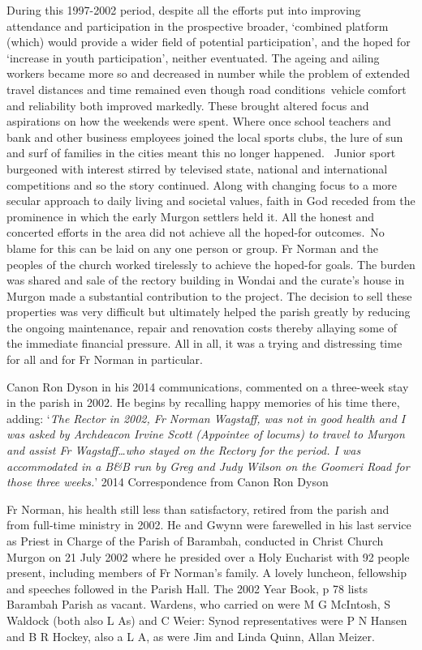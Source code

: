 During this 1997-2002 period, despite all the efforts put into improving attendance and participation in the prospective broader, `combined platform (which) would provide a wider field of potential participation', and the hoped for `increase in youth participation', neither eventuated. The ageing and ailing workers became more so and decreased in number while the problem of extended travel distances and time remained even though road conditions~vehicle comfort and reliability both improved markedly. These brought altered focus and aspirations on how the weekends were spent. Where once school teachers and bank and other business employees joined the local sports clubs, the lure of sun and surf of families in the cities meant this no longer happened.~ Junior sport burgeoned with interest stirred by televised state, national and international competitions and so the story continued. Along with changing focus to a more secular approach to daily living and societal values, faith in God receded from the prominence in which the early Murgon settlers held it. All the honest and concerted efforts in the area did not achieve all the hoped-for outcomes.~No blame for this can be laid on any one person or group. Fr Norman and the peoples of the church worked tirelessly to achieve the hoped-for goals. The burden was shared and sale of the rectory building in Wondai and the curate's house in Murgon made a substantial contribution to the project. The decision to sell these properties was very difficult but ultimately helped the parish greatly by reducing the ongoing maintenance, repair and renovation costs thereby allaying some of the immediate financial pressure. All in all, it was a trying and distressing time for all and for Fr Norman in particular.

Canon Ron Dyson in his 2014 communications, commented on a three-week stay in the parish in 2002. He begins by recalling happy memories of his time there, adding: `\emph{The Rector in 2002, Fr Norman Wagstaff, was not in good health and I was asked by Archdeacon Irvine Scott (Appointee of locums) to travel to Murgon and assist Fr Wagstaff\ldots who stayed on the Rectory for the period. I was accommodated in a B\&B run by Greg and Judy Wilson on the Goomeri Road for those three weeks.}' 2014 Correspondence from Canon Ron Dyson

Fr Norman, his health still less than satisfactory, retired from the parish and from full-time ministry in 2002. He and Gwynn were farewelled in his last service as Priest in Charge of the Parish of Barambah, conducted in Christ Church Murgon on 21 July 2002 where he presided over a Holy Eucharist with 92 people present, including members of Fr Norman's family. A lovely luncheon, fellowship and speeches followed in the Parish Hall. The 2002 Year Book, p 78 lists Barambah Parish as vacant. Wardens, who carried on were M G McIntosh, S Waldock (both also L As) and C Weier: Synod representatives were P N Hansen and B R Hockey, also a L A, as were Jim and Linda Quinn, Allan Meizer.

